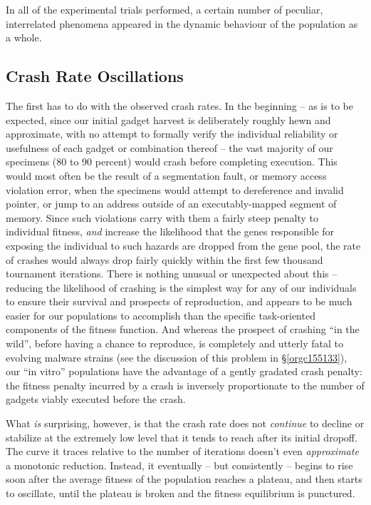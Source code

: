 \documentclass[12pt,glossary]{dalthesis}
\begin{document}
In all of the experimental trials performed, a certain number of peculiar,
interrelated phenomena appeared in the dynamic behaviour of the population
as a whole. 

\subsection{Crash Rate Oscillations}
\label{sec:org09c136a}
The first has to do with the observed crash rates. In the beginning -- as is to
be expected, since our initial gadget harvest is deliberately roughly hewn
and approximate, with no attempt to formally verify the individual reliability
or usefulness of each gadget or combination thereof -- the vast majority of our
specimens (80 to 90 percent) would crash before completing execution. This would
most often be the result of a segmentation fault, or memory access violation error,
when the specimens would attempt to dereference and invalid pointer, or jump to an
address outside of an executably-mapped segment of memory. Since such violations
carry with them a fairly steep penalty to individual fitness, \emph{and} increase the
likelihood that the genes responsible for exposing the individual to such hazards
are dropped from the gene pool, the rate of crashes would always drop fairly quickly
within the first few thousand tournament iterations. There is nothing unusual or
unexpected about this -- reducing the likelihood of crashing is the simplest way
for any of our individuals to ensure their survival and prospects of reproduction,
and appears to be much easier for our populations to accomplish than the specific
task-oriented components of the fitness function. And whereas the prospect of
crashing ``in the wild'', before having a chance to reproduce, is completely and
utterly fatal to evolving malware strains (see the discussion of this problem
in \S \ref{orgc155133}), our ``in vitro'' populations have the advantage of a gently
gradated crash penalty: the fitness penalty incurred by a crash is inversely
proportionate to the number of gadgets viably executed before the crash.

What \emph{is} surprising, however, is that the crash rate does not \emph{continue}
to decline or stabilize at the extremely low level that it tends
to reach after its initial dropoff. The curve it traces relative to the
number of iterations doesn't even \emph{approximate} a monotonic reduction.
Instead, it eventually -- but consistently -- begins to rise soon after the
average fitness of the population reaches a plateau, and then starts to
oscillate, until the plateau is broken and the fitness equilibrium is
punctured. 
\end{document}
